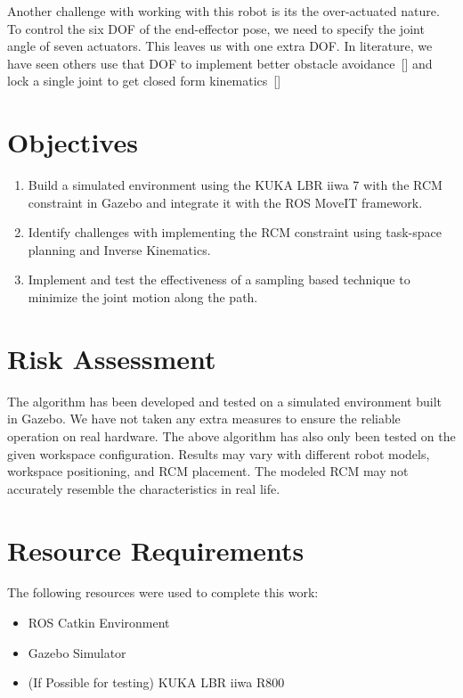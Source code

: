 \documentclass[BTech]{iitmdiss}
\begin{document}
    Another challenge with working with this robot is its the over-actuated nature.
    To control the six DOF of the end-effector pose, we need to specify the joint angle of seven actuators.
    This leaves us with one extra DOF.
    In literature, we have seen others use that DOF to implement better obstacle avoidance~[\cite{Doliwa_2020}] and lock a single joint to get closed form kinematics~[\cite{Asthana}]


    \section{Objectives}

    \begin{enumerate}
        \item Build a simulated environment using the KUKA LBR iiwa 7 with the RCM constraint in Gazebo and integrate it with the ROS MoveIT framework.
        \item Identify challenges with implementing the RCM constraint using task-space planning and Inverse Kinematics.
        \item Implement and test the effectiveness of a sampling based technique to minimize the joint motion along the path.
    \end{enumerate}


    \section{Risk Assessment}\label{sec:risk}

    The algorithm has been developed and tested on a simulated environment built in Gazebo.
    We have not taken any extra measures to ensure the reliable operation on real hardware.
    The above algorithm has also only been tested on the given workspace configuration.
    Results may vary with different robot models, workspace positioning, and RCM placement.
    The modeled RCM may not accurately resemble the characteristics in real life.


    \section{Resource Requirements}
    The following resources were used to complete this work:
    \begin{itemize}
        \item ROS Catkin Environment
        \item Gazebo Simulator
        \item (If Possible for testing) KUKA LBR iiwa R800
    \end{itemize}
\end{document}
